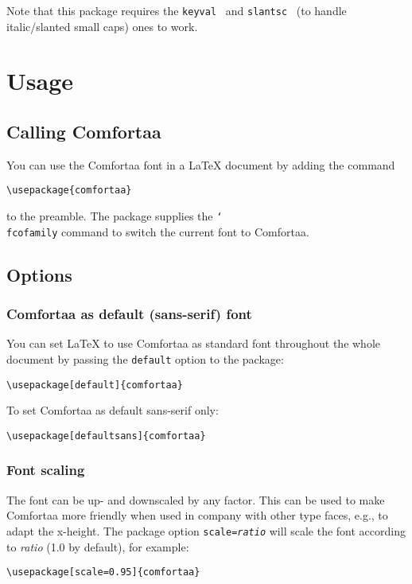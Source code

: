 \documentclass{article}
\newcommand{\code}{\texttt}
\newcommand{\package}{\texttt}
\newcommand{\parameter}[1]{\textnormal{\textit{#1}}}
\begin{document}
Note that this package requires the \package{keyval}~\cite{keyval} and
\package{slantsc}~\cite{slantsc} (to handle italic/slanted small caps) ones to
work.

\section{Usage}

\subsection{Calling Comfortaa}

You can use the Comfortaa font in a \LaTeX{} document by adding the command
\begin{verbatim}
\usepackage{comfortaa}
\end{verbatim}
to the preamble.  The package supplies the \code{\char`\\fcofamily} command to
switch the current font to Comfortaa.

\subsection{Options}

\subsubsection{Comfortaa as default (sans-serif) font}

You can set \LaTeX{} to use Comfortaa as standard font throughout the whole
document by passing the \code{default} option to the package:
\begin{verbatim}
\usepackage[default]{comfortaa}
\end{verbatim}
To set Comfortaa as default sans-serif only:
\begin{verbatim}
\usepackage[defaultsans]{comfortaa}
\end{verbatim}

\subsubsection{Font scaling}

The font can be up- and downscaled by any factor. This can be used to make
Comfortaa more friendly when used in company with other type faces, e.g., to
adapt the x-height. The package option \code{scale=\parameter{ratio}} will scale
the font according to \parameter{ratio} (1.0 by default), for example:
\begin{verbatim}
\usepackage[scale=0.95]{comfortaa}
\end{verbatim}
\end{document}

